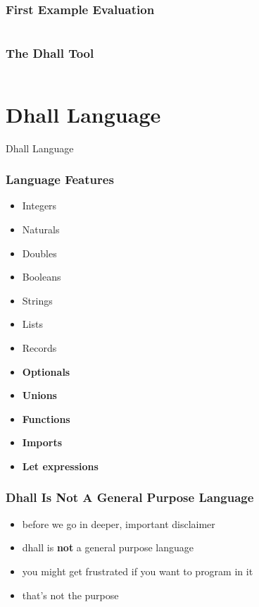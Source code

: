 \documentclass{beamer}
\begin{document}
 \begin{frame}
   \frametitle{First Example \textemdash{} Evaluation}
   \inputminted[fontsize=\small]{text}{static-source/example.dhall.out}
 \end{frame}

 \begin{frame}
   \frametitle{The Dhall Tool}
   \inputminted[fontsize=\scriptsize]{text}{static-source/dhall-help.out}
 \end{frame}

 \section{Dhall Language}
  \begin{frame}
   {\Huge Dhall Language}
 \end{frame}

 \begin{frame}
   \frametitle{Language Features}
   \begin{itemize}
   \item Integers
   \item Naturals
   \item Doubles
   \item Booleans
   \item Strings
   \item Lists
   \item Records
   \item \textbf{Optionals}
   \item \textbf{Unions}
   \item \textbf{Functions}
   \item \textbf{Imports}
   \item \textbf{Let expressions}
   \end{itemize}
 \end{frame}

 \begin{frame}
   \frametitle{Dhall Is Not A General Purpose Language}
   \begin{itemize}
   \item before we go in deeper, important disclaimer
   \item dhall is \textbf{not} a general purpose language
   \item you might get frustrated if you want to program in it
   \item that's not the purpose
   \end{itemize}
 \end{frame}
\end{document}

